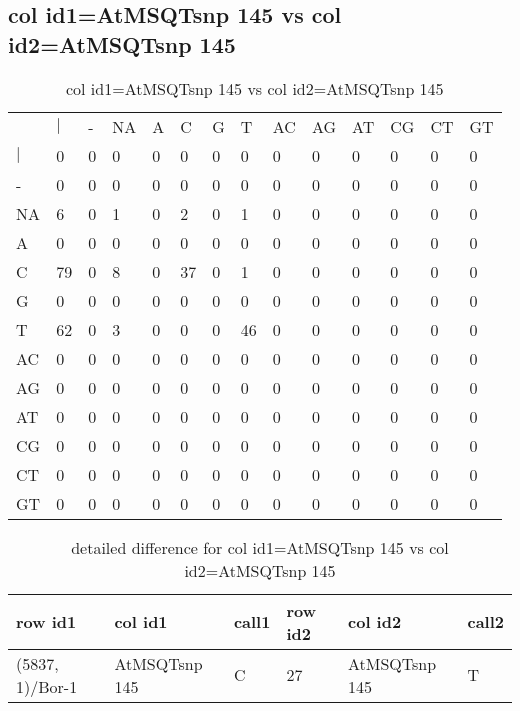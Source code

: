 \subsection{col id1=AtMSQTsnp 145 vs col id2=AtMSQTsnp 145}
\begin{center}
\begin{longtable}{|l|l|l|l|l|l|l|l|l|l|l|l|l|l|}
\caption{col id1=AtMSQTsnp 145 vs col id2=AtMSQTsnp 145} \label{table_dm534}\\
\hline
\\
\hline
&$|$&-&NA&A&C&G&T&AC&AG&AT&CG&CT&GT\\
$|$&0&0&0&0&0&0&0&0&0&0&0&0&0\\
-&0&0&0&0&0&0&0&0&0&0&0&0&0\\
NA&6&0&1&0&2&0&1&0&0&0&0&0&0\\
A&0&0&0&0&0&0&0&0&0&0&0&0&0\\
C&79&0&8&0&37&0&1&0&0&0&0&0&0\\
G&0&0&0&0&0&0&0&0&0&0&0&0&0\\
T&62&0&3&0&0&0&46&0&0&0&0&0&0\\
AC&0&0&0&0&0&0&0&0&0&0&0&0&0\\
AG&0&0&0&0&0&0&0&0&0&0&0&0&0\\
AT&0&0&0&0&0&0&0&0&0&0&0&0&0\\
CG&0&0&0&0&0&0&0&0&0&0&0&0&0\\
CT&0&0&0&0&0&0&0&0&0&0&0&0&0\\
GT&0&0&0&0&0&0&0&0&0&0&0&0&0\\
\hline
\end{longtable}
\end{center}

\begin{center}
\begin{longtable}{|l|l|l|l|l|l|}
\caption{detailed difference for col id1=AtMSQTsnp 145 vs col id2=AtMSQTsnp 145} \label{table_dm535}\\
\hline
row id1&col id1&call1&row id2&col id2&call2\\
\hline
(5837, 1)/Bor-1&AtMSQTsnp 145&C&27&AtMSQTsnp 145&T\\
\hline
\end{longtable}
\end{center}


